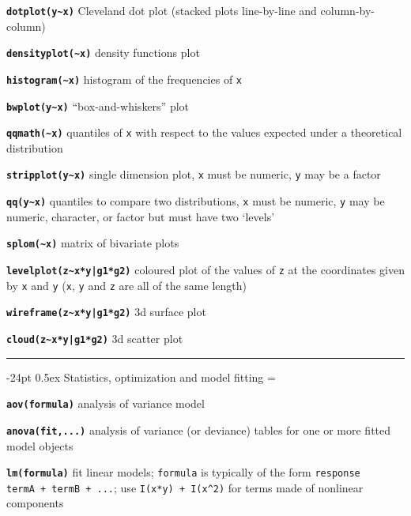 \documentclass[8pt,landscape]{article}
\makeatletter
\renewcommand\section{\@startsection{section}{1}{0mm}%
                                     {-24pt}%
                                     {0.5ex}%
                                {\color{blue}\normalfont\large\bfseries}}
\newcommand{\code}{\texttt}
\newcommand{\bcode}[1]{\texttt{\textbf{#1}}}
\makeatother
\begin{document}
\begin{multicols*}{3}
\bcode{dotplot(y\~{}x)}  Cleveland dot plot (stacked plots line-by-line
and column-by-column)

\bcode{densityplot(\~{}x)}  density functions plot

\bcode{histogram(\~{}x)}  histogram of the frequencies of \code{x}

\bcode{bwplot(y\~{}x)}  ``box-and-whiskers'' plot

\bcode{qqmath(\~{}x)}  quantiles of \code{x} with respect to the values expected under a theoretical distribution

\bcode{stripplot(y\~{}x)}  single dimension plot, \code{x} must be numeric, \code{y} may be a factor

\bcode{qq(y\~{}x)}  quantiles to compare two distributions, \code{x} must be numeric, \code{y} may be numeric, character, or factor but must have two `levels'

\bcode{splom(\~{}x)}  matrix of bivariate plots


\bcode{levelplot(z\~{}x*y|g1*g2)}  coloured plot of the values of \code{z} at the coordinates given by \code{x} and \code{y} (\code{x}, \code{y} and \code{z} are all of the same length)

\bcode{wireframe(z\~{}x*y|g1*g2)}  3d surface plot

\bcode{cloud(z\~{}x*y|g1*g2)}  3d scatter plot


\bigskip

\rule{.3\textwidth}{0.4pt}


\section{Statistics, optimization and model fitting}
\everypar={\hangindent=9mm}



\bcode{aov(formula)} analysis of variance model

\bcode{anova(fit,...)} analysis of variance (or deviance) tables for one or more
     fitted model objects


\bcode{lm(formula)} fit linear models; \code{formula} is typically of
     the form \code{response ~ termA + termB + ...}; use \code{I(x*y)
     + I(x\^{}2)} for terms made of nonlinear components


\end{multicols*}
\end{document}
